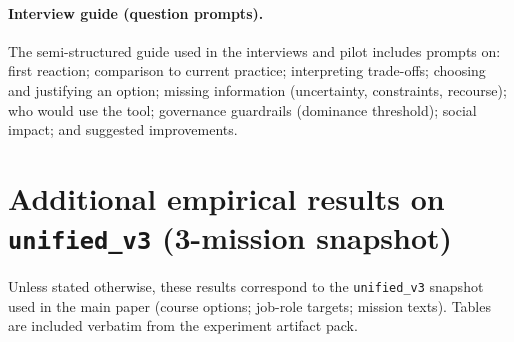 \paragraph{Interview guide (question prompts).} The semi-structured guide used in the interviews and pilot includes prompts on: first reaction; comparison to current practice; interpreting trade-offs; choosing and justifying an option; missing information (uncertainty, constraints, recourse); who would use the tool; governance guardrails (dominance threshold); social impact; and suggested improvements.

\section{Additional empirical results on \texttt{unified\_v3} (3-mission snapshot)}
\label{sec:supp-results}
Unless stated otherwise, these results correspond to the \texttt{unified\_v3} snapshot used in the main paper (\NumCourses course options; \NumOccupations job-role targets; \NumMissionsMain mission texts). Tables are included verbatim from the experiment artifact pack.











